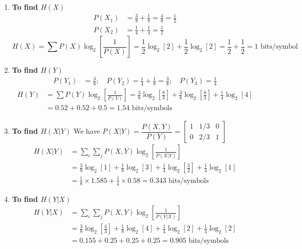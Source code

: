 \documentclass[12pt]{article}
\begin{document}
\begin{enumerate}
	\item[i.] \textbf{To find $H(X)$}
	      \begin{align*}
		      P(X_1) & = \frac{3}{8} + \frac{1}{8} = \frac{4}{8} = \frac{1}{2} \\
		      P(X_2) & = \frac{1}{4} + \frac{1}{4} = \frac{1}{2}
	      \end{align*}
	      $$H(X) = \sum P(X) \log_2 \left[ \frac{1}{P(X)} \right] = \frac{1}{2}\log_2[2] + \frac{1}{2}\log_2[2] = \frac{1}{2} + \frac{1}{2} = 1 \text{ bits/symbol}$$

	\item[ii.] \textbf{To find $H(Y)$}
	      \begin{align*}
		      P(Y_1) & = \frac{3}{8}; \quad P(Y_2) = \frac{1}{4} + \frac{1}{8} = \frac{3}{8}; \quad P(Y_3) = \frac{1}{4}
	      \end{align*}
	      \begin{align*}
		      H(Y) & = \sum P(Y) \log_2 \left[ \frac{1}{P(Y)} \right] = \frac{3}{8}\log_2\left[\frac{8}{3}\right] + \frac{3}{8}\log_2\left[\frac{8}{3}\right] + \frac{1}{4}\log_2[4] \\
		           & = 0.52 + 0.52 + 0.5 = 1.54 \text{ bits/symbols}
	      \end{align*}

	\item[iii.] \textbf{To find $H(X|Y)$}
	      We have $P(X|Y) = \dfrac{P(X,Y)}{P(Y)} = \begin{bmatrix} 1 & 1/3 & 0 \\ 0 & 2/3 & 1 \end{bmatrix}$
	      \begin{align*}
		      H(X|Y) & = \sum_i \sum_j P(X,Y) \log_2 \left[ \frac{1}{P(X|Y)} \right]                                                    \\
		             & = \frac{3}{8}\log_2[1] + \frac{1}{8}\log_2[3] + \frac{1}{4}\log_2\left[\frac{3}{2}\right] + \frac{1}{4}\log_2[1] \\
		             & = \frac{1}{8} \times 1.585 + \frac{1}{4} \times 0.58 = 0.343 \text{ bits/symbols}
	      \end{align*}

	\item[iv.] \textbf{To find $H(Y|X)$}
	      \begin{align*}
		      H(Y|X) & = \sum_i \sum_j P(X,Y) \log_2 \left[ \frac{1}{P(Y|X)} \right]                                                    \\
		             & = \frac{3}{8}\log_2\left[\frac{4}{3}\right] + \frac{1}{8}\log_2[4] + \frac{1}{4}\log_2[2] + \frac{1}{4}\log_2[2] \\
		             & = 0.155 + 0.25 + 0.25 + 0.25 = 0.905 \text{ bits/symbols}
	      \end{align*}
\end{enumerate}
\end{document}
